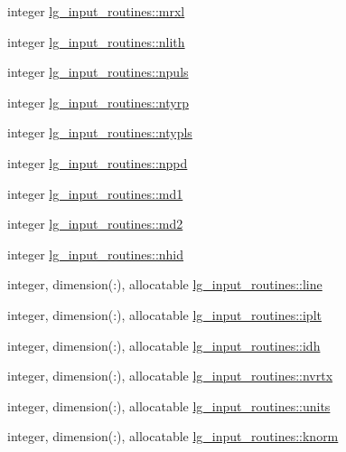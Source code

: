 \begin{DoxyCompactItemize}
\item 
integer \hyperlink{namespacelg__input__routines_a4ab280e58a30c45984c7140c4c6e1050}{lg\+\_\+input\+\_\+routines\+::mrxl}
\item 
integer \hyperlink{namespacelg__input__routines_ab0a845dec1e38a17409657c392221388}{lg\+\_\+input\+\_\+routines\+::nlith}
\item 
integer \hyperlink{namespacelg__input__routines_a7c00bd9f36754ba9c6420a7d1ae243fd}{lg\+\_\+input\+\_\+routines\+::npuls}
\item 
integer \hyperlink{namespacelg__input__routines_a3b52d5f067a80e1115bc79adb4bc39a8}{lg\+\_\+input\+\_\+routines\+::ntyrp}
\item 
integer \hyperlink{namespacelg__input__routines_ac26f639955df5fc922f956d58f7fe94a}{lg\+\_\+input\+\_\+routines\+::ntypls}
\item 
integer \hyperlink{namespacelg__input__routines_a702859cf9d00d80e7a499146a391d0eb}{lg\+\_\+input\+\_\+routines\+::nppd}
\item 
integer \hyperlink{namespacelg__input__routines_a17d7cadc2454b6016fb359a3a143f1e6}{lg\+\_\+input\+\_\+routines\+::md1}
\item 
integer \hyperlink{namespacelg__input__routines_ad088fcd28685af54ab4ccbdf35ebad22}{lg\+\_\+input\+\_\+routines\+::md2}
\item 
integer \hyperlink{namespacelg__input__routines_af75c2ef2a6d12db9bd287ce3495e8f48}{lg\+\_\+input\+\_\+routines\+::nhid}
\item 
integer, dimension(\+:), allocatable \hyperlink{namespacelg__input__routines_a6192486656a9e4b8f8a893cb39c1a3ef}{lg\+\_\+input\+\_\+routines\+::line}
\item 
integer, dimension(\+:), allocatable \hyperlink{namespacelg__input__routines_a7ac8905ebcdb83c2e30359605834b350}{lg\+\_\+input\+\_\+routines\+::iplt}
\item 
integer, dimension(\+:), allocatable \hyperlink{namespacelg__input__routines_a25ef99b6df9850605ad2562a20d87711}{lg\+\_\+input\+\_\+routines\+::idh}
\item 
integer, dimension(\+:), allocatable \hyperlink{namespacelg__input__routines_aaca8d700b89754dbbb181a41f27f68c3}{lg\+\_\+input\+\_\+routines\+::nvrtx}
\item 
integer, dimension(\+:), allocatable \hyperlink{namespacelg__input__routines_ab795991db3858f518c7ae1ef1106d716}{lg\+\_\+input\+\_\+routines\+::units}
\item 
integer, dimension(\+:), allocatable \hyperlink{namespacelg__input__routines_ac56a8d1d976273b4180c862633af12d6}{lg\+\_\+input\+\_\+routines\+::knorm}

\end{DoxyCompactItemize}
